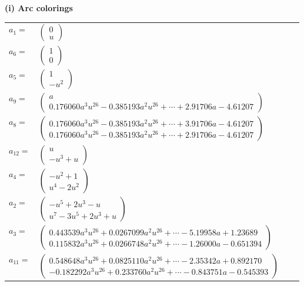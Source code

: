 \documentclass[1p]{elsarticle_modified}
\theoremstyle{definition}
\begin{document}
\flushleft \textbf{(i) Arc colorings}\\
\begin{tabular}{m{7pt} m{180pt} m{7pt} m{180pt} }
\flushright $a_{1}=$&$\begin{pmatrix}0\\u\end{pmatrix}$ \\
\flushright $a_{6}=$&$\begin{pmatrix}1\\0\end{pmatrix}$ \\
\flushright $a_{5}=$&$\begin{pmatrix}1\\- u^2\end{pmatrix}$ \\
\flushright $a_{9}=$&$\begin{pmatrix}a\\0.176060 a^{3} u^{26}-0.385193 a^{2} u^{26}+\cdots+2.91706 a-4.61207\end{pmatrix}$ \\
\flushright $a_{8}=$&$\begin{pmatrix}0.176060 a^{3} u^{26}-0.385193 a^{2} u^{26}+\cdots+3.91706 a-4.61207\\0.176060 a^{3} u^{26}-0.385193 a^{2} u^{26}+\cdots+2.91706 a-4.61207\end{pmatrix}$ \\
\flushright $a_{12}=$&$\begin{pmatrix}u\\- u^3+u\end{pmatrix}$ \\
\flushright $a_{4}=$&$\begin{pmatrix}- u^2+1\\u^4-2 u^2\end{pmatrix}$ \\
\flushright $a_{2}=$&$\begin{pmatrix}- u^5+2 u^3- u\\u^7-3 u^5+2 u^3+u\end{pmatrix}$ \\
\flushright $a_{3}=$&$\begin{pmatrix}0.443539 a^{3} u^{26}+0.0267099 a^{2} u^{26}+\cdots-5.19958 a+1.23689\\0.115832 a^{3} u^{26}+0.0266748 a^{2} u^{26}+\cdots-1.26000 a-0.651394\end{pmatrix}$ \\
\flushright $a_{11}=$&$\begin{pmatrix}0.548648 a^{3} u^{26}+0.0825110 a^{2} u^{26}+\cdots-2.35342 a+0.892170\\-0.182292 a^{3} u^{26}+0.233760 a^{2} u^{26}+\cdots-0.843751 a-0.545393\end{pmatrix}$ \\

\end{tabular}
\end{document}
